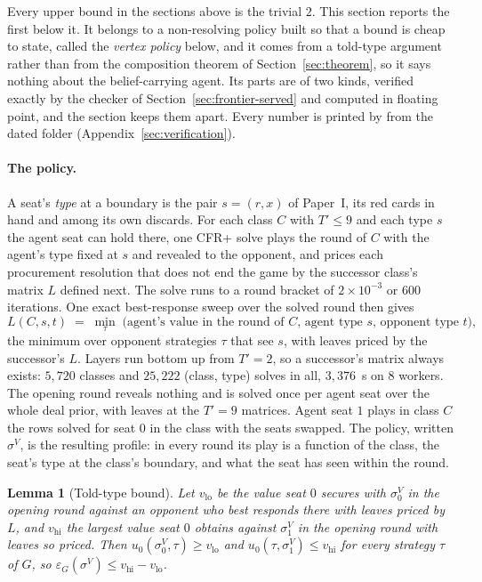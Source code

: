 \documentclass[11pt]{article}
\theoremstyle{plain}
\newtheorem{lemma}[theorem]{Lemma}
\theoremstyle{definition}
\theoremstyle{remark}
\newcommand{\game}{\ensuremath{G}}
\newcommand{\epsG}{\ensuremath{\varepsilon_{\game}}}
\begin{document}
Every upper bound in the sections above is the trivial $2$. This
section reports the first below it. It belongs to a non-resolving
policy built so that a bound is cheap to state, called the
\emph{vertex policy} below, and it comes from a told-type argument
rather than from the composition theorem of
Section~\ref{sec:theorem}, so it says nothing about the
belief-carrying agent. Its parts are of two kinds, verified exactly
by the checker of Section~\ref{sec:frontier-served} and computed in
floating point, and the section keeps them apart. Every number is
printed by  from the
dated folder 
(Appendix~\ref{sec:verification}).

\paragraph{The policy.} A seat's \emph{type} at a boundary is the pair
$s=(r,x)$ of Paper~I, its red cards in hand and among its own
discards. For each class $C$ with $T'\le9$ and each type $s$ the agent
seat can hold there, one CFR+ solve plays the round of $C$ with the
agent's type fixed at $s$ and revealed to the opponent, and prices each
procurement resolution that does not end the game by the successor
class's matrix $L$ defined next. The solve runs to a round bracket of
$2\times10^{-3}$ or $600$ iterations. One exact best-response sweep
over the solved round then gives
\[
L(C,s,t) \;=\; \min_{\tau}\; \text{(agent's value in the round of $C$, agent type $s$, opponent type $t$)},
\]
the minimum over opponent strategies $\tau$ that see $s$, with leaves
priced by the successor's $L$. Layers run bottom up from $T'=2$, so a
successor's matrix always exists: $5{,}720$ classes and $25{,}222$
(class, type) solves in all, $3{,}376$~s on $8$ workers. The opening
round reveals nothing and is solved once per agent seat over the whole
deal prior, with leaves at the $T'=9$ matrices. Agent seat $1$ plays in
class $C$ the rows solved for seat $0$ in the class with the seats
swapped. The policy, written $\sigma^{V}$, is the resulting profile:
in every round its play is a function of the class, the seat's type at
the class's boundary, and what the seat has seen within the round.

\begin{lemma}[Told-type bound]\label{lem:toldtype}
Let $v_{\mathrm{lo}}$ be the value seat $0$ secures with
$\sigma^{V}_0$ in the opening round against an opponent who best
responds there with leaves priced by $L$, and $v_{\mathrm{hi}}$ the
largest value seat $0$ obtains against $\sigma^{V}_1$ in the opening
round with leaves so priced. Then
$u_0(\sigma^{V}_0,\tau)\ge v_{\mathrm{lo}}$ and
$u_0(\tau,\sigma^{V}_1)\le v_{\mathrm{hi}}$ for every strategy $\tau$
of $\game$, so
$\epsG(\sigma^{V})\le v_{\mathrm{hi}}-v_{\mathrm{lo}}$.
\end{lemma}
\end{document}
